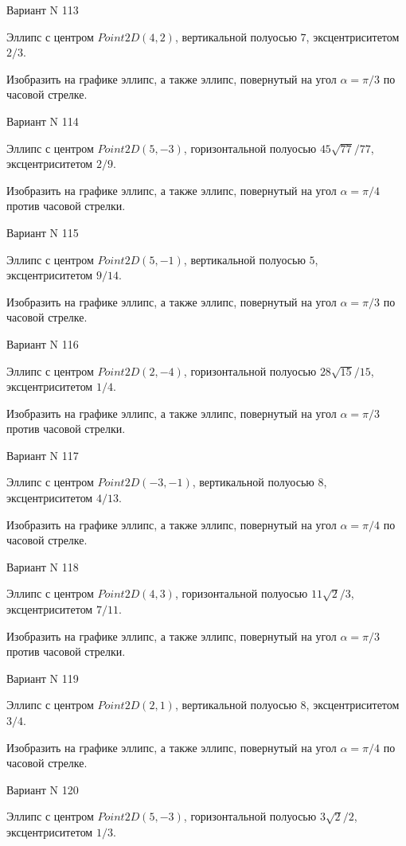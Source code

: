 \documentclass[11pt]{report}
\begin{document}
Вариант N 113

Эллипс с центром $Point2D\left(4, 2\right)$, вертикальной полуосью $7$, эксцентриситетом $2 / 3$.

    Изобразить на графике эллипс, а также эллипс, повернутый на угол $\alpha = $$\pi / 3$ по часовой стрелке.

Вариант N 114

Эллипс с центром $Point2D\left(5, -3\right)$, горизонтальной полуосью $45 \sqrt{77} / 77$, эксцентриситетом $2 / 9$.

    Изобразить на графике эллипс, а также эллипс, повернутый на угол $\alpha = $$\pi / 4$ против часовой стрелки.

Вариант N 115

Эллипс с центром $Point2D\left(5, -1\right)$, вертикальной полуосью $5$, эксцентриситетом $9 / 14$.

    Изобразить на графике эллипс, а также эллипс, повернутый на угол $\alpha = $$\pi / 3$ по часовой стрелке.

Вариант N 116

Эллипс с центром $Point2D\left(2, -4\right)$, горизонтальной полуосью $28 \sqrt{15} / 15$, эксцентриситетом $1 / 4$.

    Изобразить на графике эллипс, а также эллипс, повернутый на угол $\alpha = $$\pi / 3$ против часовой стрелки.

Вариант N 117

Эллипс с центром $Point2D\left(-3, -1\right)$, вертикальной полуосью $8$, эксцентриситетом $4 / 13$.

    Изобразить на графике эллипс, а также эллипс, повернутый на угол $\alpha = $$\pi / 4$ по часовой стрелке.

Вариант N 118

Эллипс с центром $Point2D\left(4, 3\right)$, горизонтальной полуосью $11 \sqrt{2} / 3$, эксцентриситетом $7 / 11$.

    Изобразить на графике эллипс, а также эллипс, повернутый на угол $\alpha = $$\pi / 3$ против часовой стрелки.

Вариант N 119

Эллипс с центром $Point2D\left(2, 1\right)$, вертикальной полуосью $8$, эксцентриситетом $3 / 4$.

    Изобразить на графике эллипс, а также эллипс, повернутый на угол $\alpha = $$\pi / 4$ по часовой стрелке.

Вариант N 120

Эллипс с центром $Point2D\left(5, -3\right)$, горизонтальной полуосью $3 \sqrt{2} / 2$, эксцентриситетом $1 / 3$.
\end{document}

